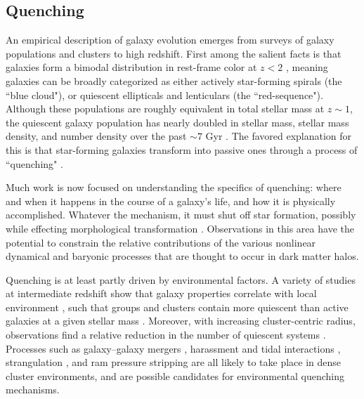 \subsection{Quenching}

An empirical description of galaxy evolution emerges from surveys of galaxy populations and clusters to high redshift.
First among the salient facts is that galaxies form a bimodal distribution in rest-frame color at $z < 2$ \citep{Strateva:2001aa,Baldry:2004aa,Bell:2004aa,Williams:2009tt}, meaning galaxies can be broadly categorized as either actively star-forming spirals (the ``blue cloud"), or quiescent ellipticals and lenticulars (the ``red-sequence").
Although these populations are roughly equivalent in total stellar mass at $z\sim1$, the quiescent galaxy population has nearly doubled in stellar mass, stellar mass density, and number density over the past $\sim7$ Gyr \citep{Arnouts:2007aa,Bell:2004aa,Borch:2006aa,Bundy:2006aa,Brown:2007aa,Faber:2007aa}.
The favored explanation for this is that star-forming galaxies transform into passive ones through a process of ``quenching" \citep{Blanton:2006aa,Bundy:2006aa,Faber:2007aa,Brammer:2011aa}.

Much work is now focused on understanding the specifics of quenching: where and when it happens in the course of a galaxy's life, and how it is physically accomplished.
Whatever the mechanism, it must shut off star formation, possibly while effecting morphological transformation \citep{Dressler:1980aa}.
Observations in this area have the potential to constrain the relative contributions of the various nonlinear dynamical and baryonic processes that are thought to occur in dark matter halos.

Quenching is at least partly driven by environmental factors.
A variety of studies at intermediate redshift show that galaxy properties correlate with local environment \citep{Cooper:2006aa,Cooper:2007aa,Quadri:2007aa,Patel:2009aa}, such that groups and clusters contain more quiescent than active galaxies at a given stellar mass \citep{George:2011aa,Muzzin:2012dw,Presotto:2012aa,Tanaka:2012aa,Nantais:2017aa}.
Moreover, with increasing cluster-centric radius, observations find a relative reduction in the number of quiescent systems \cite[e.g.][]{Presotto:2012aa}.
Processes such as galaxy–galaxy mergers \citep{Lavery:1988aa}, harassment and tidal interactions \citep{Moore:1998aa,Bekki:2011aa}, strangulation \citep{Larson:1980aa}, and ram pressure stripping \citep{Gunn:1972aa} are all likely to take place in dense cluster environments, and are possible candidates for environmental quenching mechanisms.

